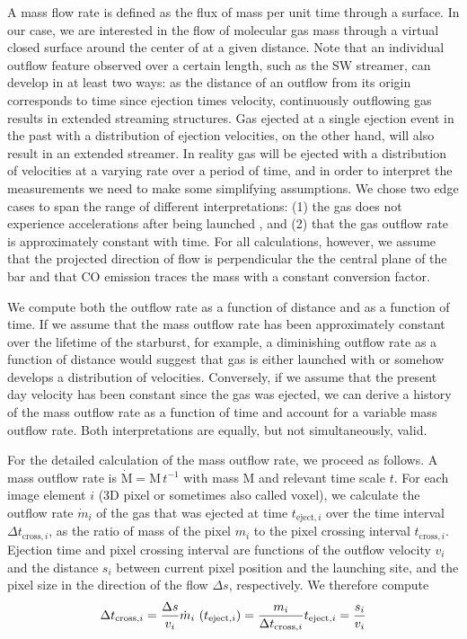 A mass flow rate is defined as the flux of mass per unit time through a surface. In our case, we are interested in the flow of molecular gas mass through a virtual closed surface around the center of  at a given distance. Note that an individual outflow feature observed over a certain length, such as the SW streamer, can develop in at least two ways: as the distance of an outflow from its origin corresponds to time since ejection times velocity, continuously outflowing gas results in extended streaming structures. Gas ejected at a single ejection event in the past with a distribution of ejection velocities, on the other hand, will also result in an extended streamer. In reality gas will be ejected with a distribution of velocities at a varying rate over a period of time, and in order to interpret the measurements we need to make some simplifying assumptions. We chose two edge cases to span the range of different interpretations: (1) the gas does not experience accelerations after being launched \citep[however, see ][]{2017ApJ...835..265W}, and (2) that the gas outflow rate is approximately constant with time. For all calculations, however, we assume that the projected direction of flow is perpendicular the the central plane of the bar and that CO emission traces the mass with a constant conversion factor.

We compute both the outflow rate as a function of distance and as a function of time. If we assume that the mass outflow rate has been approximately constant over the lifetime of the starburst, for example, a diminishing outflow rate as a function of distance would suggest that gas is either launched with or somehow develops a distribution of velocities. Conversely, if we assume that the present day velocity has been constant since the gas was ejected, we can derive a history of the mass outflow rate as a function of time and account for a variable mass outflow rate. Both interpretations are equally, but not simultaneously, valid.

For the detailed calculation of the mass outflow rate, we proceed as follows. A mass outflow rate is $\dot{\mathrm{M}} = \mathrm{M} \,t^{-1}$ with mass M and relevant time scale $t$. For each image element $i$ (3D pixel or sometimes also called voxel), we calculate the outflow rate $\dot{m}_i$ of the gas that was ejected at time $t_{{\mathrm{eject}},i}$ over the time interval $\Delta t_{\mathrm{cross},i}$, as the ratio of mass of the pixel ${m}_i$ to the pixel crossing interval $t_{\mathrm{cross},i}$. Ejection time and pixel crossing interval are functions of the outflow velocity $v_i$ and the distance $s_i$ between current pixel position and the launching site, and the pixel size in the direction of the flow $\Delta s$, respectively. We therefore compute
\begin{equation}
    \Delta t_{\mathrm{cross},i}   = \frac{\Delta s}{v_i}\\    
    \dot{m}_i\ (t_{\mathrm{eject},i}) = \frac{m_i}{\Delta t_{\mathrm{cross},i}}\\
    t_{\mathrm{eject},i} = \frac{s_i}{v_i}
\end{equation}

